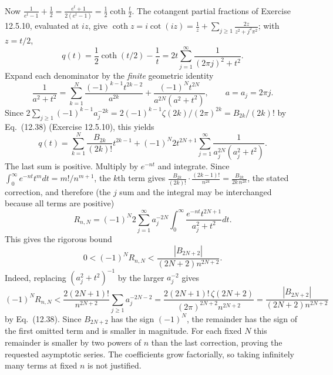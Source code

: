 Now $\frac1{e^t-1}+\frac12=\frac{e^t+1}{2(e^t-1)}=\frac12\coth\frac t2$.
The cotangent partial fractions of Exercise 12.5.10, evaluated at $iz$,
give $\coth z=i\cot(iz)=\frac1z+\sum_{j\ge1}\frac{2z}{z^2+j^2\pi^2}$;
with $z=t/2$,
\[
q(t)=\frac12\coth(t/2)-\frac1t
=2t\sum_{j=1}^{\infty}\frac1{(2\pi j)^2+t^2}.
\]
Expand each denominator by the \emph{finite} geometric identity
\[
\frac1{a^2+t^2}=\sum_{k=1}^N\frac{(-1)^{k-1}t^{2k-2}}{a^{2k}}
+\frac{(-1)^Nt^{2N}}{a^{2N}(a^2+t^2)},\qquad a=a_j=2\pi j.
\]
Since
$2\sum_{j\ge1}(-1)^{k-1}a_j^{-2k}=2(-1)^{k-1}\zeta(2k)/(2\pi)^{2k}
=B_{2k}/(2k)!$ by Eq.~(12.38) (Exercise 12.5.10), this yields
\[
q(t)=\sum_{k=1}^N\frac{B_{2k}}{(2k)!}t^{2k-1}
+(-1)^N2t^{2N+1}\sum_{j=1}^{\infty}
\frac1{a_j^{2N}(a_j^2+t^2)}.
\]
The last sum is positive. Multiply by $e^{-nt}$ and integrate. Since
$\int_0^\infty e^{-nt}t^m dt=m!/n^{m+1}$, the $k$th term gives
$\frac{B_{2k}}{(2k)!}\cdot\frac{(2k-1)!}{n^{2k}}=\frac{B_{2k}}{2k\,n^{2k}}$,
the stated correction, and therefore (the $j$ sum and the integral may
be interchanged because all terms are positive)
\[
R_{n,N}=(-1)^N2\sum_{j=1}^{\infty}a_j^{-2N}
\int_0^\infty\frac{e^{-nt}t^{2N+1}}{a_j^2+t^2}dt.
\]
This gives the rigorous bound
\[
\boxed{0<(-1)^N R_{n,N}
<\frac{|B_{2N+2}|}{(2N+2)n^{2N+2}}}.
\]
Indeed, replacing $(a_j^2+t^2)^{-1}$ by the larger $a_j^{-2}$ gives
\[
(-1)^NR_{n,N}<\frac{2(2N+1)!}{n^{2N+2}}\sum_{j\ge1}a_j^{-2N-2}
=\frac{2(2N+1)!\,\zeta(2N+2)}{(2\pi)^{2N+2}n^{2N+2}}
=\frac{|B_{2N+2}|}{(2N+2)n^{2N+2}}
\]
by Eq.~(12.38). Since $B_{2N+2}$ has the sign $(-1)^N$, the remainder
has the sign of the first omitted term and is smaller in magnitude.
For each fixed $N$ this remainder is smaller by two powers of $n$
than the last correction, proving the requested asymptotic series.
The coefficients grow factorially, so taking infinitely many terms at
fixed $n$ is not justified.

